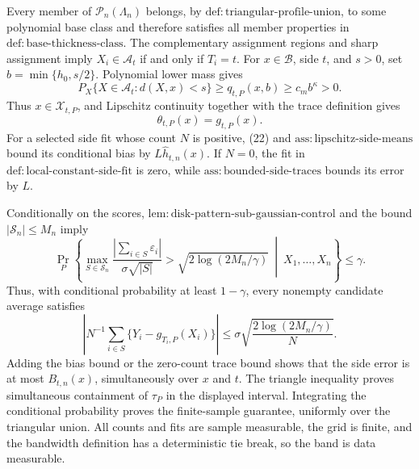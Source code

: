 Every member of \(\mathcal P_n(\Lambda_n)\) belongs, by \(\mathrm{def:triangular\text{-}profile\text{-}union}\), to some polynomial base class and therefore satisfies all member properties in \(\mathrm{def:base\text{-}thickness\text{-}class}\). The complementary assignment regions and sharp assignment imply \(X_i\in\mathcal A_t\) if and only if \(T_i=t\). For \(x\in\mathcal B\), side \(t\), and \(s>0\), set \(b=\min\{h_0,s/2\}\). Polynomial lower mass gives
\[
 P_X\{X\in\mathcal A_t:d(X,x)<s\}
 \ge q_{t,P}(x,b)\ge c_mb^\kappa>0.
\]
Thus \(x\in\mathcal X_{t,P}\), and Lipschitz continuity together with the trace definition gives
\[
 \theta_{t,P}(x)=g_{t,P}(x). \tag{22}
\]
For a selected side fit whose count \(N\) is positive, (22) and \(\mathrm{ass:lipschitz\text{-}side\text{-}means}\) bound its conditional bias by \(L\widehat h_{t,n}(x)\). If \(N=0\), the fit in \(\mathrm{def:local\text{-}constant\text{-}side\text{-}fit}\) is zero, while \(\mathrm{ass:bounded\text{-}side\text{-}traces}\) bounds its error by \(L\).

Conditionally on the scores, \(\mathrm{lem:disk\text{-}pattern\text{-}sub\text{-}gaussian\text{-}control}\) and the bound \(|\mathscr S_n|\le M_n\) imply
\[
 \Pr_P\left\{\max_{S\in\mathscr S_n}
 \frac{|\sum_{i\in S}\varepsilon_i|}{\sigma\sqrt{|S|}}
 >\sqrt{2\log(2M_n/\gamma)}
 \ \middle|\ X_1,\ldots,X_n\right\}\le\gamma. \tag{23}
\]
Thus, with conditional probability at least \(1-\gamma\), every nonempty candidate average satisfies
\[
 \left|N^{-1}\sum_{i\in S}\{Y_i-g_{T_i,P}(X_i)\}\right|
 \le\sigma\sqrt{\frac{2\log(2M_n/\gamma)}N}. \tag{24}
\]
Adding the bias bound or the zero-count trace bound shows that the side error is at most \(B_{t,n}(x)\), simultaneously over \(x\) and \(t\). The triangle inequality proves simultaneous containment of \(\tau_P\) in the displayed interval. Integrating the conditional probability proves the finite-sample guarantee, uniformly over the triangular union. All counts and fits are sample measurable, the grid is finite, and the bandwidth definition has a deterministic tie break, so the band is data measurable.

